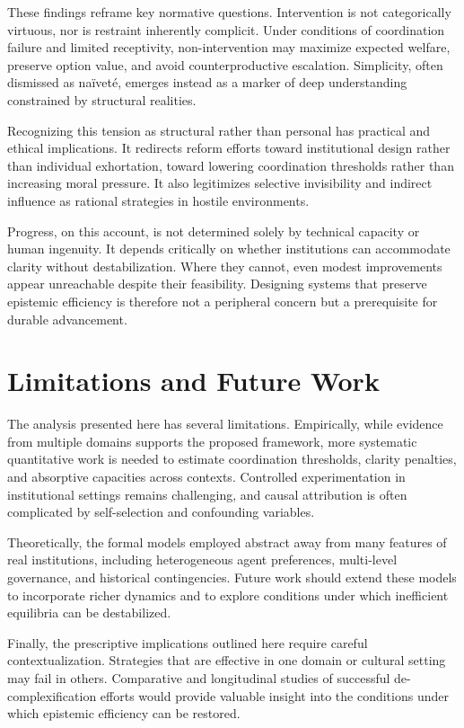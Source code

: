 \documentclass[11pt]{article}
\begin{document}
These findings reframe key normative questions. Intervention is not categorically virtuous, nor is restraint inherently complicit. Under conditions of coordination failure and limited receptivity, non-intervention may maximize expected welfare, preserve option value, and avoid counterproductive escalation. Simplicity, often dismissed as naïveté, emerges instead as a marker of deep understanding constrained by structural realities.

Recognizing this tension as structural rather than personal has practical and ethical implications. It redirects reform efforts toward institutional design rather than individual exhortation, toward lowering coordination thresholds rather than increasing moral pressure. It also legitimizes selective invisibility and indirect influence as rational strategies in hostile environments.

Progress, on this account, is not determined solely by technical capacity or human ingenuity. It depends critically on whether institutions can accommodate clarity without destabilization. Where they cannot, even modest improvements appear unreachable despite their feasibility. Designing systems that preserve epistemic efficiency is therefore not a peripheral concern but a prerequisite for durable advancement.



\section*{Limitations and Future Work}

The analysis presented here has several limitations. Empirically, while evidence from multiple domains supports the proposed framework, more systematic quantitative work is needed to estimate coordination thresholds, clarity penalties, and absorptive capacities across contexts. Controlled experimentation in institutional settings remains challenging, and causal attribution is often complicated by self-selection and confounding variables.

Theoretically, the formal models employed abstract away from many features of real institutions, including heterogeneous agent preferences, multi-level governance, and historical contingencies. Future work should extend these models to incorporate richer dynamics and to explore conditions under which inefficient equilibria can be destabilized.

Finally, the prescriptive implications outlined here require careful contextualization. Strategies that are effective in one domain or cultural setting may fail in others. Comparative and longitudinal studies of successful de-complexification efforts would provide valuable insight into the conditions under which epistemic efficiency can be restored.
\end{document}
